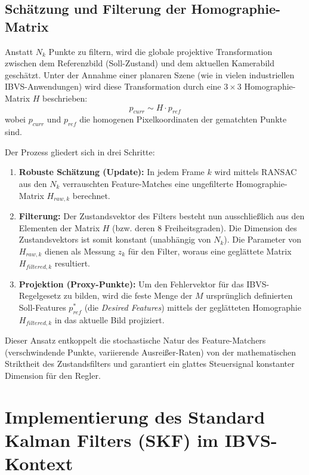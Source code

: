 \documentclass{article}
\begin{document}
\subsection{Schätzung und Filterung der Homographie-Matrix}
Anstatt $N_k$ Punkte zu filtern, wird die globale projektive Transformation zwischen dem Referenzbild (Soll-Zustand) und dem aktuellen Kamerabild geschätzt. 
Unter der Annahme einer planaren Szene (wie in vielen industriellen IBVS-Anwendungen) wird diese Transformation durch eine $3 \times 3$ Homographie-Matrix $H$ beschrieben:
\begin{equation}
    p_{curr} \sim H \cdot p_{ref}
\end{equation}
wobei $p_{curr}$ und $p_{ref}$ die homogenen Pixelkoordinaten der gematchten Punkte sind.

Der Prozess gliedert sich in drei Schritte:
\begin{enumerate}
    \item \textbf{Robuste Schätzung (Update):} In jedem Frame $k$ wird mittels RANSAC aus den $N_k$ verrauschten Feature-Matches eine ungefilterte Homographie-Matrix $H_{raw, k}$ berechnet.
    \item \textbf{Filterung:} Der Zustandsvektor des Filters besteht nun ausschließlich aus den Elementen der Matrix $H$ (bzw. deren 8 Freiheitsgraden). Die Dimension des Zustandsvektors ist somit konstant (unabhängig von $N_k$). Die Parameter von $H_{raw, k}$ dienen als Messung $z_k$ für den Filter, woraus eine geglättete Matrix $H_{filtered, k}$ resultiert.
    \item \textbf{Projektion (Proxy-Punkte):} Um den Fehlervektor für das IBVS-Regelgesetz zu bilden, wird die feste Menge der $M$ ursprünglich definierten Soll-Features $p_{ref}^*$ (die \textit{Desired Features}) mittels der geglätteten Homographie $H_{filtered, k}$ in das aktuelle Bild projiziert.
\end{enumerate}

Dieser Ansatz entkoppelt die stochastische Natur des Feature-Matchers (verschwindende Punkte, variierende Ausreißer-Raten) von der mathematischen Striktheit des Zustandsfilters und garantiert ein glattes Steuersignal konstanter Dimension für den Regler.





\section{Implementierung des Standard Kalman Filters (SKF) im IBVS-Kontext}
\label{sec:skf_implementation}
\end{document}
